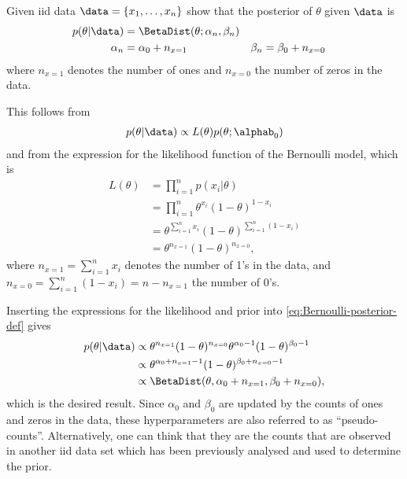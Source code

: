 \begin{exenumerate}
\item Given iid data $\data = \{x_1, \ldots, x_n\}$ show that the posterior of $\theta$ given $\data$ is
  \begin{align*}
    p(\theta | \data) &= \BetaDist(\theta ; \alpha_n, \beta_n)\\
    \alpha_n &= \alpha_0 + n_{x=1} & \beta_n &= \beta_0 + n_{x=0}
  \end{align*}
  where $n_{x=1}$ denotes the number of ones and $n_{x=0}$ the number of zeros in the data.

  \begin{solution}
    This follows from
    \begin{align}
      p(\theta | \data) \propto L(\theta) p(\theta ; \alphab_0) \label{eq:Bernoulli-posterior-def}
    \end{align}
    and from the expression for the likelihood function of the Bernoulli model, which is
    \begin{align}
      L(\theta) &= \prod_{i=1}^n p(x_i|\theta)\\
      & = \prod_{i=1}^n  \theta^{x_i} (1-\theta)^{1-x_i}\\
      & = \theta^{\sum_{i=1}^n x_i} (1-\theta)^{\sum_{i=1}^n (1-x_i)}\\
      & = \theta^{n_{x=1}}(1-\theta)^{n_{x=0}},
    \end{align}
    where $n_{x=1} = \sum_{i=1}^n x_i$ denotes the number of 1's in
    the data, and $n_{x=0}=\sum_{i=1}^n (1-x_i)=n-n_{x=1}$ the number
    of 0's.

    Inserting the expressions for the likelihood and prior into
    \eqref{eq:Bernoulli-posterior-def} gives
    \begin{align}
      p(\theta | \data) &\propto \theta^{n_{x=1}}(1-\theta)^{n_{x=0}}\theta^{\alpha_0-1}(1-\theta)^{\beta_0-1}\\
      & \propto \theta^{\alpha_0+n_{x=1}-1}(1-\theta)^{\beta_0+n_{x=0}-1}\\
      & \propto \BetaDist(\theta, \alpha_0+n_{x=1}, \beta_0+n_{x=0}),
    \end{align}
    which is the desired result. Since $\alpha_0$ and $\beta_0$ are
    updated by the counts of ones and zeros in the data, these
    hyperparameters are also referred to as
    ``pseudo-counts''. Alternatively, one can think that they are the
    counts that are observed in another iid data set which has been
    previously analysed and used to determine the prior.
  \end{solution}


\end{exenumerate}
